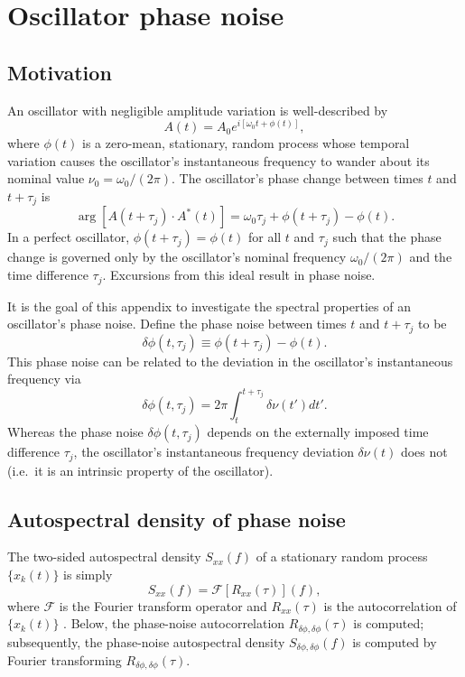 \chapter{Oscillator phase noise}


\section{Motivation}
An oscillator with negligible amplitude variation is well-described by
\begin{equation}
  A(t) = A_0 e^{i [\omega_0 t + \phi(t)]},
\end{equation}
where $\phi(t)$ is a zero-mean, stationary, random process
whose temporal variation causes
the oscillator's instantaneous frequency
to wander about its nominal value $\nu_0 = \omega_0 / (2 \pi)$.
The oscillator's phase change between
times $t$ and $t + \tau_j$ is
\begin{equation}
  \arg[A(t + \tau_j) \cdot A^*(t)]
  =
  \omega_0 \tau_j + \phi(t + \tau_j) - \phi(t).
\end{equation}
In a perfect oscillator,
$\phi(t + \tau_j) = \phi(t)$ for all $t$ and $\tau_j$
such that the phase change is governed only by
the oscillator's nominal frequency $\omega_0 / (2 \pi)$ and
the time difference $\tau_j$.
Excursions from this ideal result in phase noise.

It is the goal of this appendix
to investigate the spectral properties
of an oscillator's phase noise.
Define the phase noise between times $t$ and $t + \tau_j$ to be
\begin{equation}
  \delta \phi(t, \tau_j)
  \equiv
  \phi(t + \tau_j) - \phi(t).
\end{equation}
This phase noise can be related to
the deviation in the oscillator's instantaneous frequency via
\begin{equation}
  \delta \phi(t, \tau_j)
  =
  2 \pi \int_{t}^{t + \tau_j} \delta \nu(t') dt'.
  \label{eq:OscillatorPhaseNoise:phase_noise_from_frequency_deviation}
\end{equation}
Whereas the phase noise $\delta \phi(t, \tau_j)$
depends on the externally imposed time difference $\tau_j$,
the oscillator's instantaneous frequency deviation $\delta \nu(t)$ does not
(i.e.\ it is an intrinsic property of the oscillator).


\section{Autospectral density of phase noise}
The two-sided autospectral density $S_{xx}(f)$
of a stationary random process $\{x_k(t)\}$ is simply
\begin{equation}
  S_{xx}(f) = \mathcal{F}[R_{xx}(\tau)](f),
\end{equation}
where $\mathcal{F}$ is the Fourier transform operator and
$R_{xx}(\tau)$ is the autocorrelation of $\{x_k(t)\}$
\cite[Sec.~5.2.1]{bendat_and_piersol}.
Below, the phase-noise autocorrelation
$R_{\delta\phi,\delta\phi}(\tau)$ is computed;
subsequently, the phase-noise autospectral density
$S_{\delta\phi,\delta\phi}(f)$ is computed
by Fourier transforming
$R_{\delta\phi,\delta\phi}(\tau)$.


